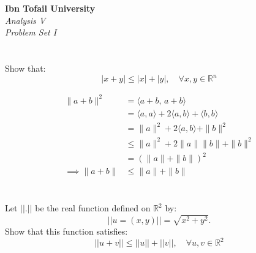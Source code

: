 \documentclass[12pt]{article}
\begin{document}
\begin{center}
	\Large\textbf{Ibn Tofail University} \\[1em]
	\large\textit{Analysis V} \\[2em]
	\large\textit{Problem Set I} \\[0.5 em]
\end{center}

\vspace{1cm}

\section{}
Show that:
$$|x+y| \le |x| + |y|, \quad \forall x, y \in \mathbb{R}^n$$


\begin{correctionbox}
    \begin{align*}
        \|a+b\|^2 &= \langle a+b,\,a+b \rangle \\
        &= \langle a,a \rangle + 2\langle a,b \rangle + \langle b,b \rangle \\ 
        &= \|a\|^2 + 2\langle a,b \rangle + \|b\|^2 \\
        &\leq \|a\|^2 + 2\|a\|\|b\| + \|b\|^2 \\
        &= (\|a\| + \|b\|)^2 \\
        \implies \|a+b\| &\leq \|a\| + \|b\| 
    \end{align*}
\end{correctionbox}

\section{}
Let $||.||$ be the real function defined on $\mathbb{R}^{2}$ by:
$$||u=(x,y)|| = \sqrt{x^{2} + y^{2}}.$$
Show that this function satisfies:
$$||u+v|| \le ||u|| + ||v||, \quad \forall u, v \in \mathbb{R}^{2}$$


\begin{correctionbox}
\end{correctionbox}
\end{document}
